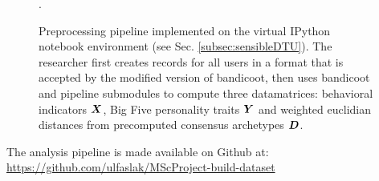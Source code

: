\begin{figure}
\begin{minipage}[r]{0.19\textwidth}
	\end{minipage}
	\caption{\label{fig:preprocessing_pipeline}Preprocessing pipeline implemented on the virtual IPython notebook environment (see Sec. \ref{subsec:sensibleDTU}). The researcher first creates records for all users in a format that is accepted by the modified version of bandicoot, then uses bandicoot and pipeline submodules to compute three datamatrices: behavioral indicators $\bm{X}$, Big Five personality traits $\bm{Y}$ and weighted euclidian distances from precomputed consensus archetypes $\bm{D}$.}.
\end{figure}

The analysis pipeline is made available on Github at:\\

\url{https://github.com/ulfaslak/MScProject-build-dataset}